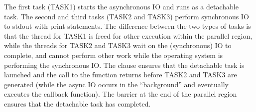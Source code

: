 The first task (TASK1) starts the asynchronous IO and runs as a detachable task.
The second and third tasks (TASK2 and TASK3) perform synchronous IO to stdout with print statements.
The difference between the two types of tasks is that the thread for TASK1 is freed for 
other execution within the parallel region, while the threads for TASK2 and TASK3 wait
on the (synchronous) IO to complete, and cannot perform other work while the 
operating system is performing the synchronous IO. 
The  clause ensures that the detachable task is launched 
and the call to the  function returns
before TASK2 and TASK3 are generated (while the async IO occurs in the ``background'' and eventually
executes the callback function).  The barrier at the end of the parallel region ensures that the
detachable task has completed.


